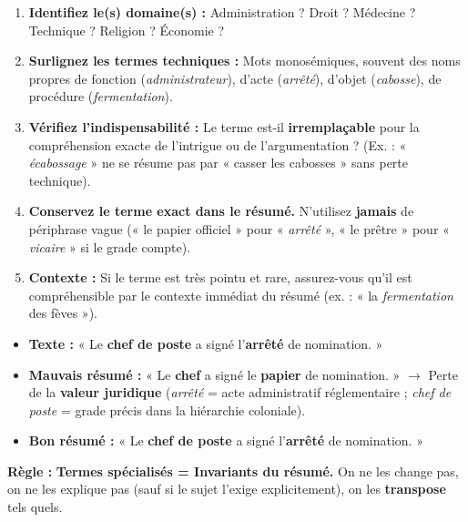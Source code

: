 \documentclass[11pt]{article}
\begin{document}
\begin{methode}
\begin{enumerate}
    \item \textbf{Identifiez le(s) domaine(s) :} Administration ? Droit ? Médecine ? Technique ? Religion ? Économie ?
    \item \textbf{Surlignez les termes techniques :} Mots monosémiques, souvent des noms propres de fonction (\emph{administrateur}), d'acte (\emph{arrêté}), d'objet (\emph{cabosse}), de procédure (\emph{fermentation}).
    \item \textbf{Vérifiez l'indispensabilité :} Le terme est-il \textbf{irremplaçable} pour la compréhension exacte de l'intrigue ou de l'argumentation ? (Ex. : « \emph{écabossage} » ne se résume pas par « casser les cabosses » sans perte technique).
    \item \textbf{Conservez le terme exact dans le résumé.} N'utilisez \textbf{jamais} de périphrase vague (« le papier officiel » pour « \emph{arrêté} », « le prêtre » pour « \emph{vicaire} » si le grade compte).
    \item \textbf{Contexte :} Si le terme est très pointu et rare, assurez-vous qu'il est compréhensible par le contexte immédiat du résumé (ex. : « la \emph{fermentation} des fèves »).
\end{enumerate}
\end{methode}

\begin{attention}
\begin{itemize}
    \item \textbf{Texte :} « Le \textbf{chef de poste} a signé l'\textbf{arrêté} de nomination. »
    \item \textbf{Mauvais résumé :} « Le \textbf{chef} a signé le \textbf{papier} de nomination. » $\rightarrow$ Perte de la \textbf{valeur juridique} (\emph{arrêté} = acte administratif réglementaire ; \emph{chef de poste} = grade précis dans la hiérarchie coloniale).
    \item \textbf{Bon résumé :} « Le \textbf{chef de poste} a signé l'\textbf{arrêté} de nomination. »
\end{itemize}
\textbf{Règle :} \textbf{Termes spécialisés = Invariants du résumé.} On ne les change pas, on ne les explique pas (sauf si le sujet l'exige explicitement), on les \textbf{transpose} tels quels.
\end{attention}
\end{document}
